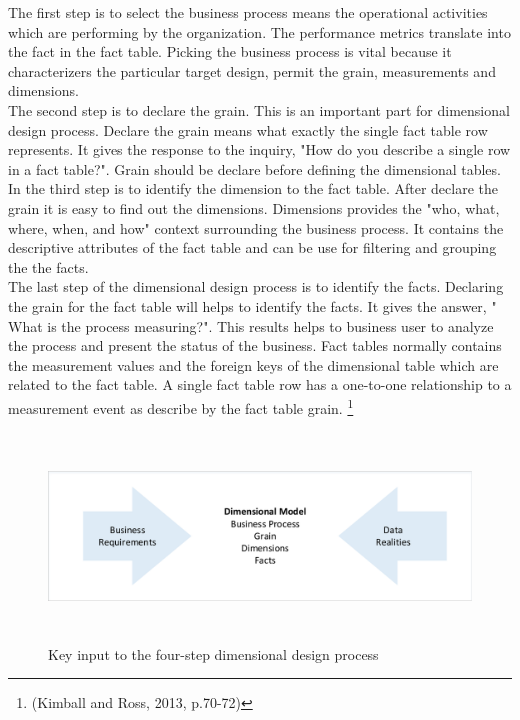 \label{sec:section}

The first step is to select the business process means the operational activities which are performing by the organization. The performance metrics translate into the fact in the fact table. Picking the business process is vital because it characterizers the particular target design, permit the grain, measurements and dimensions.\\

The second step is to declare the grain. This is an important part for dimensional design process. Declare the grain means what exactly the single fact table row represents. It gives the response to the inquiry, "How do you describe a single row in a fact table?". Grain should be declare before defining the dimensional tables. \\

In the third step is to identify the dimension to the fact table. After declare the grain it is easy to find out the dimensions. Dimensions provides the "who, what, where, when, and how" context surrounding the business process. It contains the descriptive attributes of the fact table and can be use for filtering and grouping the the facts.  \\

The last step of the dimensional design process is to identify the facts. Declaring the grain for the fact table will helps to identify the facts. It gives the answer, " What is the process measuring?". This results helps to business user to analyze the process and present the status of the business. Fact tables normally contains the measurement values and the foreign keys of the dimensional table which are related to the fact table. A single fact table row has a one-to-one relationship to a measurement event as describe by the fact table grain. \footnote{(Kimball and Ross, 2013, p.70-72)}

\begin{figure}[!ht]
	\centering
		\includegraphics[width=pt, height=156pt, width=1.0\textwidth]{images/fsddp.pdf}
	\caption[Key input to the four-step dimensional design process.]{Key input to the four-step dimensional design process\footnotemark} 
	\label{fig:showcase}

\end{figure}
